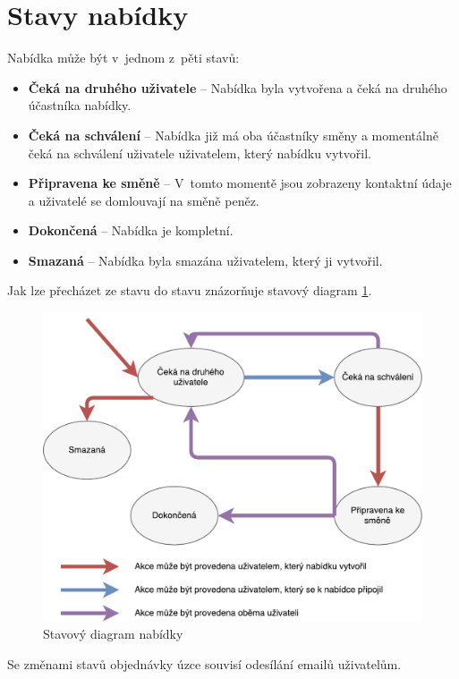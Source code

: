 \section{Stavy nabídky}
\label{nur:status}

Nabídka může být v~jednom z~pěti stavů:
\begin{itemize}
    \item \textbf{Čeká na druhého uživatele} -- Nabídka byla vytvořena a čeká na druhého účastníka nabídky.
    \item \textbf{Čeká na schválení} -- Nabídka již má oba účastníky směny a momentálně čeká na schválení uživatele uživatelem, který nabídku vytvořil.
    \item \textbf{Připravena ke směně} -- V~tomto momentě jsou zobrazeny kontaktní údaje a uživatelé se domlouvají na směně peněz.
    \item \textbf{Dokončená} -- Nabídka je kompletní.
    \item \textbf{Smazaná} -- Nabídka byla smazána uživatelem, který ji vytvořil.
\end{itemize}
Jak lze přecházet ze stavu do stavu znázorňuje stavový diagram \ref{fig:implementation:state-diagram}.
\begin{figure}[h]
    \centering
    \includegraphics[width=1.0\textwidth]{media/state-diagram-cs}
    \caption{Stavový diagram nabídky}
    \label{fig:implementation:state-diagram}
\end{figure}

Se změnami stavů objednávky úzce souvisí odesílání emailů uživatelům.
